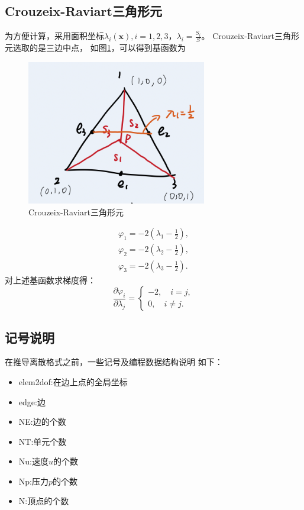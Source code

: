 \documentclass{ctexart}
\begin{document}
\subsection{Crouzeix-Raviart三角形元\cite{有限元方法的数学基础}}
为方便计算，采用面积坐标$\lambda_i(\mathbf{x}),i=1,2,3$，$\lambda_i = \frac{S_i}{S}$。
Crouzeix-Raviart三角形元选取的是三边中点，
如图\ref{Fig.barycentric}，可以得到基函数为

\begin{figure}[H] %
    \centering %
    \includegraphics[width=0.7\textwidth]{img/barycentric.png} %
    \caption{Crouzeix-Raviart三角形元} %
    \label{Fig.barycentric} %
\end{figure}

\begin{gather}
    \varphi_1 = -2(\lambda_1 - \frac{1}{2}), \\
    \varphi_2 = -2(\lambda_2 - \frac{1}{2}), \\
    \varphi_3 = -2(\lambda_3 - \frac{1}{2}).
\end{gather}
对上述基函数求梯度得：
\begin{equation}
    \label{基函数梯度}
    \frac{\partial \varphi_i}{\partial \lambda_j}=
    \left\{\begin{matrix}
        -2, \quad i=j,\\ 
        0, \quad i \neq j.
    \end{matrix}\right.
\end{equation}

\subsection{记号说明}
在推导离散格式之前，一些记号及编程数据结构说明
\cite{FEMCode}如下：
\begin{itemize}
    \item elem2dof:在边上点的全局坐标
    \item edge:边
    \item NE:边的个数
    \item NT:单元个数
    \item Nu:速度$u$的个数
    \item Np:压力$p$的个数
    \item N:顶点的个数
\end{itemize}
\end{document}

